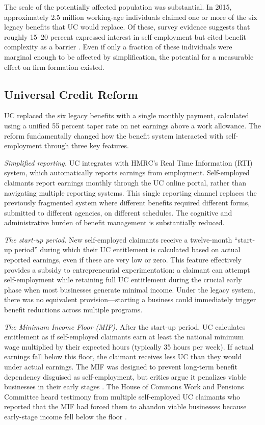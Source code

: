 \documentclass[12pt]{article}
\begin{document}
The scale of the potentially affected population was substantial. In 2015, approximately 2.5 million working-age individuals claimed one or more of the six legacy benefits that UC would replace. Of these, survey evidence suggests that roughly 15--20 percent expressed interest in self-employment but cited benefit complexity as a barrier \citep{griffiths2024going}. Even if only a fraction of these individuals were marginal enough to be affected by simplification, the potential for a measurable effect on firm formation existed.

\subsection{Universal Credit Reform}

UC replaced the six legacy benefits with a single monthly payment, calculated using a unified 55 percent taper rate on net earnings above a work allowance. The reform fundamentally changed how the benefit system interacted with self-employment through three key features.

\textit{Simplified reporting.} UC integrates with HMRC's Real Time Information (RTI) system, which automatically reports earnings from employment. Self-employed claimants report earnings monthly through the UC online portal, rather than navigating multiple reporting systems. This single reporting channel replaces the previously fragmented system where different benefits required different forms, submitted to different agencies, on different schedules. The cognitive and administrative burden of benefit management is substantially reduced.

\textit{The start-up period.} New self-employed claimants receive a twelve-month ``start-up period'' during which their UC entitlement is calculated based on actual reported earnings, even if these are very low or zero. This feature effectively provides a subsidy to entrepreneurial experimentation: a claimant can attempt self-employment while retaining full UC entitlement during the crucial early phase when most businesses generate minimal income. Under the legacy system, there was no equivalent provision---starting a business could immediately trigger benefit reductions across multiple programs.

\textit{The Minimum Income Floor (MIF).} After the start-up period, UC calculates entitlement as if self-employed claimants earn at least the national minimum wage multiplied by their expected hours (typically 35 hours per week). If actual earnings fall below this floor, the claimant receives less UC than they would under actual earnings. The MIF was designed to prevent long-term benefit dependency disguised as self-employment, but critics argue it penalizes viable businesses in their early stages \citep{griffiths2024going, uk2018selfemployment}. The House of Commons Work and Pensions Committee heard testimony from multiple self-employed UC claimants who reported that the MIF had forced them to abandon viable businesses because early-stage income fell below the floor \citep{uk2018selfemployment}.
\end{document}
